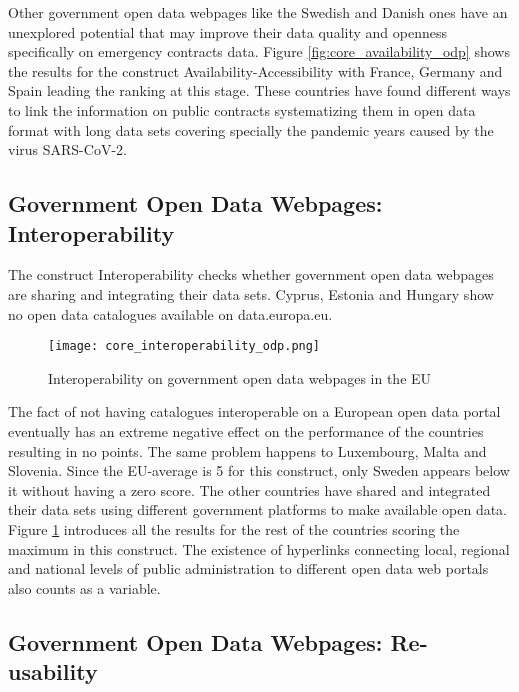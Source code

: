 \documentclass[a4paper, twoside]{report}
\begin{document}
Other government open data webpages like the Swedish and Danish ones have an unexplored potential that may improve their data quality and openness specifically on emergency contracts data. Figure \ref{fig:core_availability_odp} shows the results for the construct Availability-Accessibility with France, Germany and Spain leading the ranking at this stage. These countries have found different ways to link the information on public contracts systematizing them in open data format with long data sets covering specially the pandemic years caused by the virus SARS-CoV-2.\\      


\subsection{Government Open Data Webpages: Interoperability}

The construct Interoperability checks whether government open data webpages are sharing and integrating their data sets. Cyprus, Estonia and Hungary show no open data catalogues available on data.europa.eu.\\

\begin{figure}[H]
\centering
	\caption{Interoperability on government open data webpages in the EU}
	\texttt{[image: core\_interoperability\_odp.png]}
	\label{fig:core_interoperability_odp}
\end{figure}

The fact of not having catalogues interoperable on a European open data portal eventually has an extreme negative effect on the performance of the countries resulting in no points. The same problem happens to Luxembourg, Malta and Slovenia. Since the EU-average is 5 for this construct, only Sweden appears below it without having a zero score. The other countries have shared and integrated their data sets using different government platforms to make available open data. Figure \ref{fig:core_interoperability_odp} introduces all the results for the rest of the countries scoring the maximum in this construct. The existence of hyperlinks connecting local, regional and national levels of public administration to different open data web portals also counts as a variable.\\


\subsection{Government Open Data Webpages: Re-usability}
\end{document}
